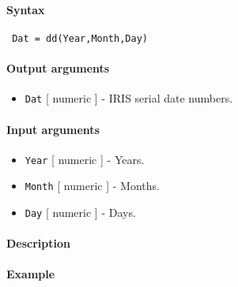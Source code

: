 


	\paragraph{Syntax}
 
 \begin{verbatim}
 Dat = dd(Year,Month,Day)
 \end{verbatim}
 
 \paragraph{Output arguments}
 
 \begin{itemize}
 \item
   \texttt{Dat} {[} numeric {]} - IRIS serial date numbers.
 \end{itemize}
 
 \paragraph{Input arguments}
 
 \begin{itemize}
 \item
   \texttt{Year} {[} numeric {]} - Years.
 \item
   \texttt{Month} {[} numeric {]} - Months.
 \item
   \texttt{Day} {[} numeric {]} - Days.
 \end{itemize}
 
 \paragraph{Description}
 
 \paragraph{Example}


